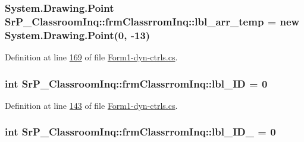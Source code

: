 \hypertarget{class_sr_p___classroom_inq_1_1frm_classrrom_inq_ae3405b23105270490b9685ac52e1b574}{
\subsubsection[{lbl\-\_\-arr\-\_\-temp}]{\setlength{\rightskip}{0pt plus 5cm}\-System.\-Drawing.\-Point {\bf \-Sr\-P\-\_\-\-Classroom\-Inq\-::frm\-Classrrom\-Inq\-::lbl\-\_\-arr\-\_\-temp} = new \-System.\-Drawing.\-Point(0, -\/13)}}
\label{class_sr_p___classroom_inq_1_1frm_classrrom_inq_ae3405b23105270490b9685ac52e1b574}


\-Definition at line \hyperlink{_form1-dyn-ctrls_8cs_source_l00169}{169} of file \hyperlink{_form1-dyn-ctrls_8cs_source}{\-Form1-\/dyn-\/ctrls.\-cs}.

\hypertarget{class_sr_p___classroom_inq_1_1frm_classrrom_inq_a15d44adc56e5e6523bfadd27d9966935}{
\subsubsection[{lbl\-\_\-\-I\-D}]{\setlength{\rightskip}{0pt plus 5cm}int {\bf \-Sr\-P\-\_\-\-Classroom\-Inq\-::frm\-Classrrom\-Inq\-::lbl\-\_\-\-I\-D} = 0}}
\label{class_sr_p___classroom_inq_1_1frm_classrrom_inq_a15d44adc56e5e6523bfadd27d9966935}


\-Definition at line \hyperlink{_form1-dyn-ctrls_8cs_source_l00143}{143} of file \hyperlink{_form1-dyn-ctrls_8cs_source}{\-Form1-\/dyn-\/ctrls.\-cs}.

\hypertarget{class_sr_p___classroom_inq_1_1frm_classrrom_inq_a5d14fbec9e02ebe6942d26ae8ed53d3b}{
\subsubsection[{lbl\-\_\-\-I\-D\-\_\-2}]{\setlength{\rightskip}{0pt plus 5cm}int {\bf \-Sr\-P\-\_\-\-Classroom\-Inq\-::frm\-Classrrom\-Inq\-::lbl\-\_\-\-I\-D\-\_} = 0}}
\label{class_sr_p___classroom_inq_1_1frm_classrrom_inq_a5d14fbec9e02ebe6942d26ae8ed53d3b}


